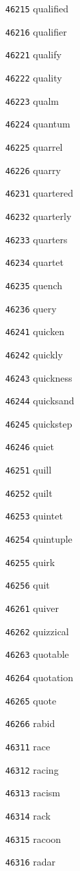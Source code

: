 \documentclass[twoside,11pt]{article}
\begin{document}
\begin{multicols}{5}
\begin{enumerate}
\item[\texttt{46215}] qualified
\item[\texttt{46216}] qualifier
\item[\texttt{46221}] qualify
\item[\texttt{46222}] quality
\item[\texttt{46223}] qualm
\item[\texttt{46224}] quantum
\item[\texttt{46225}] quarrel
\item[\texttt{46226}] quarry
\item[\texttt{46231}] quartered
\item[\texttt{46232}] quarterly
\item[\texttt{46233}] quarters
\item[\texttt{46234}] quartet
\item[\texttt{46235}] quench
\item[\texttt{46236}] query
\item[\texttt{46241}] quicken
\item[\texttt{46242}] quickly
\item[\texttt{46243}] quickness
\item[\texttt{46244}] quicksand
\item[\texttt{46245}] quickstep
\item[\texttt{46246}] quiet
\item[\texttt{46251}] quill
\item[\texttt{46252}] quilt
\item[\texttt{46253}] quintet
\item[\texttt{46254}] quintuple
\item[\texttt{46255}] quirk
\item[\texttt{46256}] quit
\item[\texttt{46261}] quiver
\item[\texttt{46262}] quizzical
\item[\texttt{46263}] quotable
\item[\texttt{46264}] quotation
\item[\texttt{46265}] quote
\item[\texttt{46266}] rabid
\item[\texttt{46311}] race
\item[\texttt{46312}] racing
\item[\texttt{46313}] racism
\item[\texttt{46314}] rack
\item[\texttt{46315}] racoon
\item[\texttt{46316}] radar

\end{enumerate}
\end{multicols}
\end{document}
